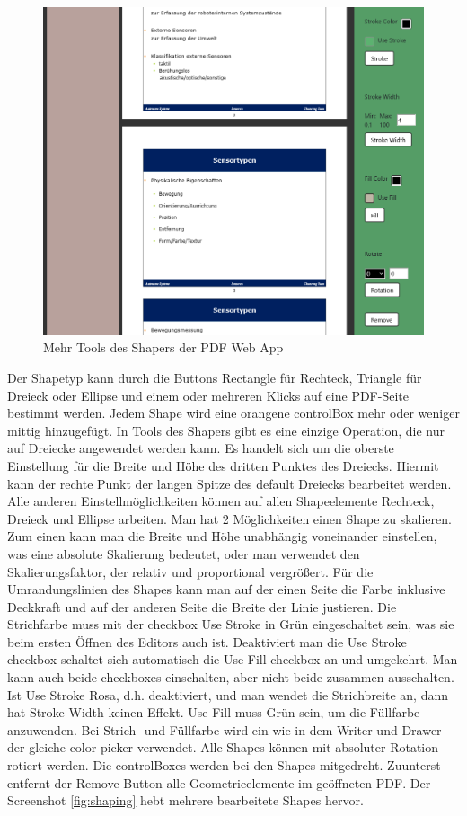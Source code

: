 \begin{figure}[!htbp]
	\centering
	\includegraphics[width=1\textwidth]{"images/shaper2.png"}
	\caption{Mehr Tools des Shapers der PDF Web App}
	\label{fig:shaper2}
\end{figure}

Der Shapetyp kann durch die Buttons Rectangle für Rechteck, Triangle für Dreieck oder Ellipse und einem oder mehreren Klicks auf eine PDF-Seite bestimmt werden. Jedem Shape wird eine orangene controlBox mehr oder weniger mittig hinzugefügt. In Tools des Shapers gibt es eine einzige Operation, die nur auf Dreiecke angewendet werden kann. Es handelt sich um die oberste Einstellung für die Breite und Höhe des dritten Punktes des Dreiecks. Hiermit kann der rechte Punkt der langen Spitze des default Dreiecks bearbeitet werden. Alle anderen Einstellmöglichkeiten können auf allen Shapeelemente Rechteck, Dreieck und Ellipse arbeiten. Man hat 2 Möglichkeiten einen Shape zu skalieren. Zum einen kann man die Breite und Höhe unabhängig voneinander einstellen, was eine absolute Skalierung bedeutet, oder man verwendet den Skalierungsfaktor, der relativ und proportional vergrößert. Für die Umrandungslinien des Shapes kann man auf der einen Seite die Farbe inklusive Deckkraft und auf der anderen Seite die Breite der Linie justieren. Die Strichfarbe muss mit der checkbox Use Stroke in Grün eingeschaltet sein, was sie beim ersten Öffnen des Editors auch ist. Deaktiviert man die Use Stroke checkbox schaltet sich automatisch die Use Fill checkbox an und umgekehrt. Man kann auch beide checkboxes einschalten, aber nicht beide zusammen ausschalten. Ist Use Stroke Rosa, d.h. deaktiviert, und man wendet die Strichbreite an, dann hat Stroke Width keinen Effekt. Use Fill muss Grün sein, um die Füllfarbe anzuwenden. Bei Strich- und Füllfarbe wird ein wie in dem Writer und Drawer der gleiche color picker verwendet. Alle Shapes können mit absoluter Rotation rotiert werden. Die controlBoxes werden bei den Shapes mitgedreht. Zuunterst entfernt der Remove-Button alle Geometrieelemente im geöffneten PDF. Der Screenshot \ref{fig:shaping} hebt mehrere bearbeitete Shapes hervor.

